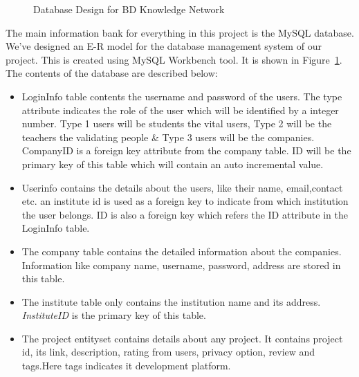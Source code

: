 \documentclass{scrreprt}
\begin{document}
\begin{figure}[b]
\begin{center}
\end{center} 
\caption{Database Design for BD Knowledge Network\label{DB}}
\end{figure}
The main information bank for everything in this project is the MySQL database. We've designed an E-R model for the database management system of our project. This is created using MySQL Workbench tool. It is shown in Figure~\ref{DB}. The contents of the database are described below:
\begin{itemize}
\item LoginInfo table contents the username and password of the users. The type attribute indicates the role of the user which will be identified by a integer number. Type 1 users will be students the vital users, Type 2 will be the teachers the validating people \& Type 3 users will be the companies. CompanyID is a foreign key attribute from the company table. ID will be the primary key of this table which will contain an auto incremental value.
\item Userinfo contains the details about the users, like their name, email,contact etc. an institute id is used as a foreign key to indicate from which institution the user belongs. ID is also a foreign key which refers the ID attribute in the LoginInfo table.
\item The company table contains the detailed information about the companies. Information like company name, username, password, address are stored in this table.
\item The institute table only contains the institution name and its address. \emph{InstituteID} is the primary key of this table.
\item The project entityset contains details about any project. It contains project id, its link, description, rating from users, privacy option, review and tags.Here tags indicates it development platform.
\end{itemize}
\end{document}
